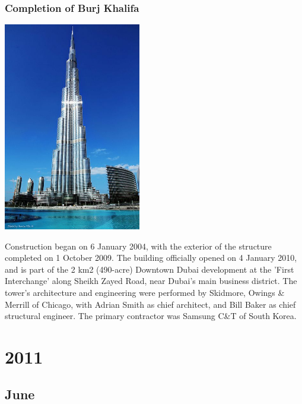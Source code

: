\documentclass[11pt]{report}
\begin{document}
\subsection{Completion of Burj Khalifa}
\vspace{2mm}\begin{center}\includegraphics[width=6cm]{./img/burjKhalifa.jpg}\end{center}
Construction began on 6 January 2004, with the exterior of the structure completed on 1 October 2009. The building officially opened on 4 January 2010, and is part of the 2 km2 (490-acre) Downtown Dubai development at the 'First Interchange' along Sheikh Zayed Road, near Dubai's main business district. The tower's architecture and engineering were performed by Skidmore, Owings \& Merrill of Chicago, with Adrian Smith as chief architect, and Bill Baker as chief structural engineer. The primary contractor was Samsung C\&T of South Korea.

\chapter{2011}
\section{June}
\end{document}
